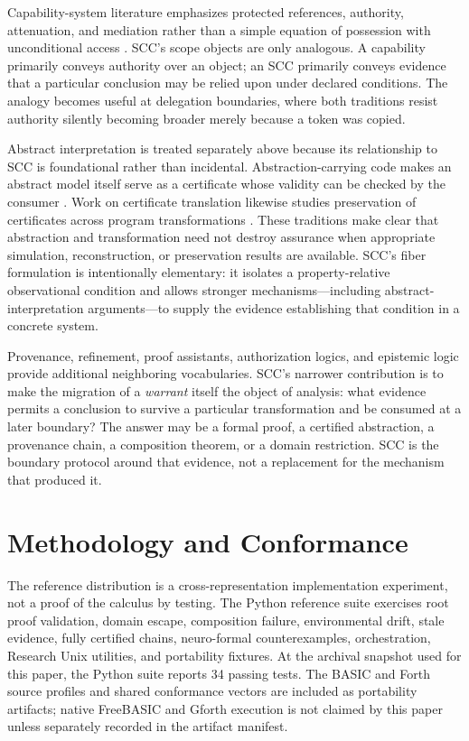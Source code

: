 \documentclass[11pt]{article}
\begin{document}
Capability-system literature emphasizes protected references, authority, attenuation, and mediation rather than a simple equation of possession with unconditional access \cite{saltzer1975protection}. SCC's scope objects are only analogous. A capability primarily conveys authority over an object; an SCC primarily conveys evidence that a particular conclusion may be relied upon under declared conditions. The analogy becomes useful at delegation boundaries, where both traditions resist authority silently becoming broader merely because a token was copied.

Abstract interpretation is treated separately above because its relationship to SCC is foundational rather than incidental. Abstraction-carrying code makes an abstract model itself serve as a certificate whose validity can be checked by the consumer \cite{albert2011acc}. Work on certificate translation likewise studies preservation of certificates across program transformations \cite{barthe2011translation}. These traditions make clear that abstraction and transformation need not destroy assurance when appropriate simulation, reconstruction, or preservation results are available. SCC's fiber formulation is intentionally elementary: it isolates a property-relative observational condition and allows stronger mechanisms---including abstract-interpretation arguments---to supply the evidence establishing that condition in a concrete system.

Provenance, refinement, proof assistants, authorization logics, and epistemic logic provide additional neighboring vocabularies. SCC's narrower contribution is to make the migration of a \emph{warrant} itself the object of analysis: what evidence permits a conclusion to survive a particular transformation and be consumed at a later boundary? The answer may be a formal proof, a certified abstraction, a provenance chain, a composition theorem, or a domain restriction. SCC is the boundary protocol around that evidence, not a replacement for the mechanism that produced it.

\section{Methodology and Conformance}
The reference distribution is a cross-representation implementation experiment, not a proof of the calculus by testing. The Python reference suite exercises root proof validation, domain escape, composition failure, environmental drift, stale evidence, fully certified chains, neuro-formal counterexamples, orchestration, Research Unix utilities, and portability fixtures. At the archival snapshot used for this paper, the Python suite reports 34 passing tests. The BASIC and Forth source profiles and shared conformance vectors are included as portability artifacts; native FreeBASIC and Gforth execution is not claimed by this paper unless separately recorded in the artifact manifest.
\end{document}
